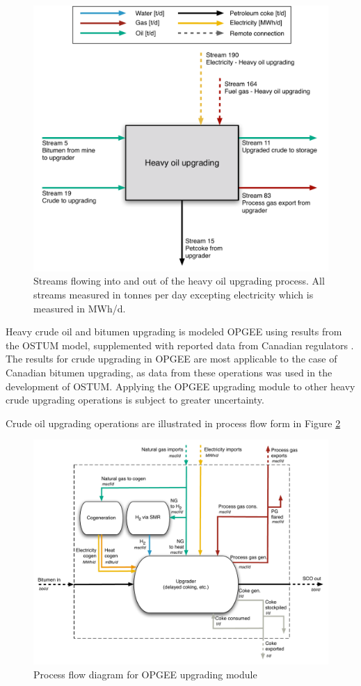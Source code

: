 \documentclass[11pt]{report}
\begin{document}
\begin{figure}
\includegraphics[width=0.85\columnwidth]{images/heavy_oil_upgrading_PF.pdf}
\caption{Streams flowing into and out of the heavy oil upgrading process. All streams measured in tonnes per day excepting electricity which is measured in MWh/d.}
\label{fig:heavy_oil_upgrading_PF}
\end{figure}


Heavy crude oil and bitumen upgrading is modeled OPGEE using results from the OSTUM model, supplemented with reported data from Canadian regulators \cite{OSTUM2016}. The results for crude upgrading in OPGEE are most applicable to the case of Canadian bitumen upgrading, as data from these operations was used in the development of OSTUM. Applying the OPGEE upgrading module to other heavy crude upgrading operations is subject to greater uncertainty.

Crude oil upgrading operations are illustrated in process flow form in Figure \ref{fig:upgrading}
\begin{landscape}
\begin{figure}[t]
\includegraphics[width=0.85\columnwidth]{images/upgrading.pdf}
\caption{Process flow diagram for OPGEE upgrading module}
\label{fig:upgrading}
\end{figure}
\end{landscape}
\end{document}
